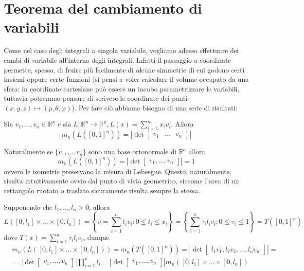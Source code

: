 \section{Teorema del cambiamento di variabili}
Come nel caso degli integrali a singola variabile, vogliamo adesso effettuare dei cambi di variabile all'interno degli integrali. Infatti il passaggio a coordinate permette, spesso, di fruire più facilmente di alcune simmetrie
di cui godono certi insiemi oppure certe funzioni (si pensi a voler calcolare il volume occupato da una sfera: in coordinate cartesiane può essere un incubo parametrizzare le variabili, tuttavia potremmo pensare di scrivere le coordinate dei punti $(x, y, z) \mapsto (\rho, \theta, \varphi)$). Per fare ciò abbiamo bisogno di una serie di risultati:
%
\vspace{0.5cm}
\begin{theorem}
	Sia $v_1, \ldots, v_n \in \mathbb{R}^n$ e sia $L : \mathbb{R}^n \to \mathbb{R}^n, L(x) = \sum\limits_{i=1}^n x_i v_i$. Allora
	\begin{equation}
		m_n(L([0, 1]^n)) = \left| \det \begin{bmatrix} v_1 & \ldots & v_n \end{bmatrix} \right|
	\end{equation}	
\end{theorem}
%
\begin{remark}
	Naturalmente se $\{ v_1, \ldots, v_n \}$ sono una base ortonormale di $\mathbb{R}^n$ allora 
	$$
	m_n(L([0,1]^n)) = \left| \det \begin{bmatrix} v_1, \ldots, v_n \end{bmatrix} \right| = 1
	$$
	ovvero le isometrie preservano la misura di Lebesgue. Questo, naturalmente, risulta intuitivamente ovvio dal punto di vista geometrico, siccome l'area di un rettangolo ruotato o traslato sicuramente risulta sempre la stessa.
\end{remark}
%
\begin{remark}
	Supponendo che $l_1, \ldots, l_n > 0$, allora
	$$
	L([0, l_1] \times \ldots \times [0, l_n]) = \left\{ v = \sum_{i=1}^n t_i v_i : 0 \leq t_i \leq x_i \right\} = \left\{ \sum_{i=1}^n \tau_i l_i v_i :  0 \leq \tau_i \leq 1 \right\} = T([0,1]^n)
	$$
	dove $T(x)=\sum\limits_{i=1}^n \tau_i l_i v_i$, dunque
	\[\begin{aligned}
	&m_n(L([0, l_1] \times \ldots \times [0, l_n])) = m_n(T([0,1]^n)) = \left| \det \begin{bmatrix} l_1v_1, l_2v_2, \ldots, l_n v_n \end{bmatrix} \right| = \\
	&=\left| \det \begin{bmatrix} v_1, \ldots, v_n \end{bmatrix} \right| \prod_{i=1}^n l_i = \left| \det \begin{bmatrix} v_1, \ldots, v_n \end{bmatrix} \right| m_n([0, l_1] \times \ldots \times [0, l_n])  
	\end{aligned}\]
\end{remark}
